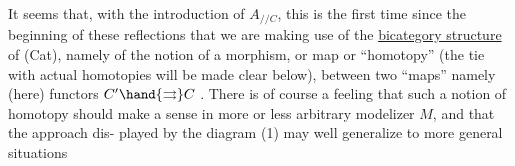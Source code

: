It seems that,  with the introduction of $A_{//C}$,  this is the first
time since the beginning of these reflections that  we are making use of
the \uline{bicategory structure} of (Cat),  namely of the notion of a morphism,
or map or ``homotopy'' (the tie with actual homotopies will be made clear
below),  between two ``maps'' namely (here) functors  $C' \hand{\rightrightarrows} C$ .  There is
of course a feeling that such a notion of homotopy should make a sense in
 more or less arbitrary modelizer $M$,  and that the approach dis-%
played by the diagram (1) may well generalize to more general situations

